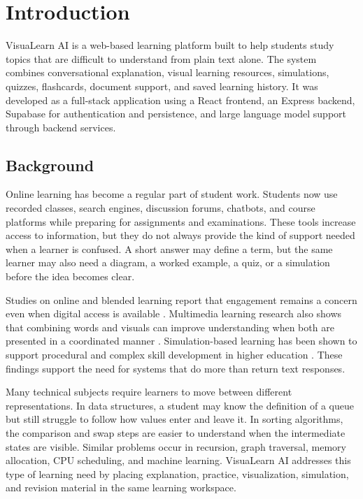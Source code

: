 \chapter{Introduction}

VisuaLearn AI is a web-based learning platform built to help students study topics that are difficult to understand from plain text alone. The system combines conversational explanation, visual learning resources, simulations, quizzes, flashcards, document support, and saved learning history. It was developed as a full-stack application using a React frontend, an Express backend, Supabase for authentication and persistence, and large language model support through backend services.

\section[Background]{\textbf{Background}}

Online learning has become a regular part of student work. Students now use recorded classes, search engines, discussion forums, chatbots, and course platforms while preparing for assignments and examinations. These tools increase access to information, but they do not always provide the kind of support needed when a learner is confused. A short answer may define a term, but the same learner may also need a diagram, a worked example, a quiz, or a simulation before the idea becomes clear.

Studies on online and blended learning report that engagement remains a concern even when digital access is available \cite{Martin2018,Instructure2023}. Multimedia learning research also shows that combining words and visuals can improve understanding when both are presented in a coordinated manner \cite{Mayer2009}. Simulation-based learning has been shown to support procedural and complex skill development in higher education \cite{Chernikova2020}. These findings support the need for systems that do more than return text responses.

Many technical subjects require learners to move between different representations. In data structures, a student may know the definition of a queue but still struggle to follow how values enter and leave it. In sorting algorithms, the comparison and swap steps are easier to understand when the intermediate states are visible. Similar problems occur in recursion, graph traversal, memory allocation, CPU scheduling, and machine learning. VisuaLearn AI addresses this type of learning need by placing explanation, practice, visualization, simulation, and revision material in the same learning workspace.


